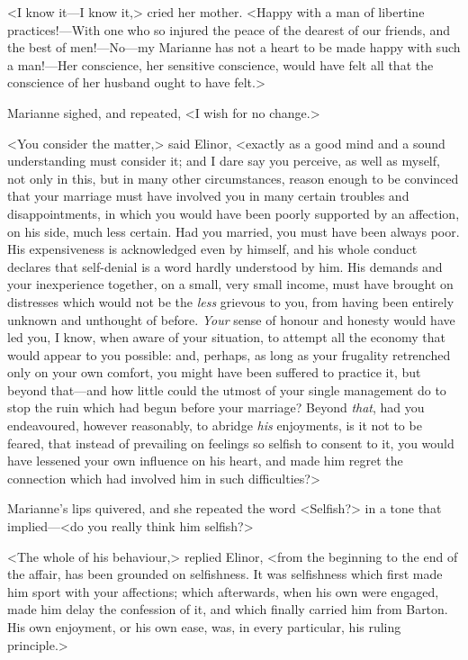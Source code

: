 <I know it—I know it,> cried her mother. <Happy with a man of libertine practices!—With one who so injured the peace of the dearest of our friends, and the best of men!—No—my Marianne has not a heart to be made happy with such a man!—Her conscience, her sensitive conscience, would have felt all that the conscience of her husband ought to have felt.>

Marianne sighed, and repeated, <I wish for no change.>

<You consider the matter,> said Elinor, <exactly as a good mind and a sound understanding must consider it; and I dare say you perceive, as well as myself, not only in this, but in many other circumstances, reason enough to be convinced that your marriage must have involved you in many certain troubles and disappointments, in which you would have been poorly supported by an affection, on his side, much less certain. Had you married, you must have been always poor. His expensiveness is acknowledged even by himself, and his whole conduct declares that self-denial is a word hardly understood by him. His demands and your inexperience together, on a small, very small income, must have brought on distresses which would not be the \textit{less} grievous to you, from having been entirely unknown and unthought of before. \textit{Your} sense of honour and honesty would have led you, I know, when aware of your situation, to attempt all the economy that would appear to you possible: and, perhaps, as long as your frugality retrenched only on your own comfort, you might have been suffered to practice it, but beyond that—and how little could the utmost of your single management do to stop the ruin which had begun before your marriage? Beyond \textit{that}, had you endeavoured, however reasonably, to abridge \textit{his} enjoyments, is it not to be feared, that instead of prevailing on feelings so selfish to consent to it, you would have lessened your own influence on his heart, and made him regret the connection which had involved him in such difficulties?>

Marianne's lips quivered, and she repeated the word <Selfish?> in a tone that implied—<do you really think him selfish?>

<The whole of his behaviour,> replied Elinor, <from the beginning to the end of the affair, has been grounded on selfishness. It was selfishness which first made him sport with your affections; which afterwards, when his own were engaged, made him delay the confession of it, and which finally carried him from Barton. His own enjoyment, or his own ease, was, in every particular, his ruling principle.>

